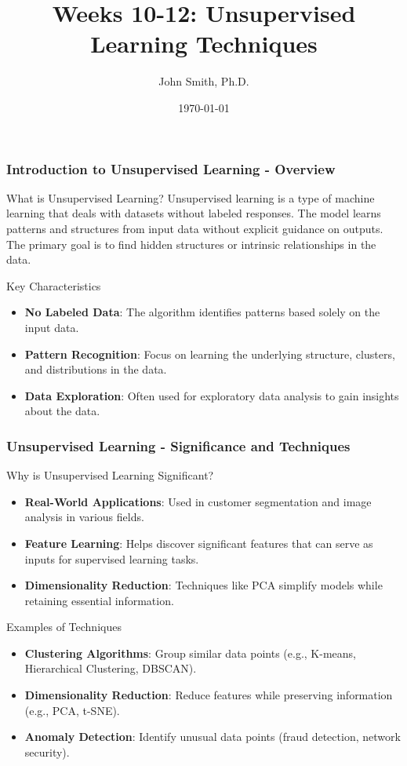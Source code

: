 \documentclass[aspectratio=169]{beamer}
\title[Unsupervised Learning Techniques]{Weeks 10-12: Unsupervised Learning Techniques}
\author[J. Smith]{John Smith, Ph.D.}
\institute[University Name]{
  Department of Computer Science\\
  University Name\\
  \vspace{0.3cm}
  Email: email@university.edu\\
  Website: www.university.edu
}
\date{\today}
\begin{document}
\frame{\titlepage}

\begin{frame}[fragile]
    \frametitle{Introduction to Unsupervised Learning - Overview}
    \begin{block}{What is Unsupervised Learning?}
        Unsupervised learning is a type of machine learning that deals with datasets without labeled responses. The model learns patterns and structures from input data without explicit guidance on outputs. The primary goal is to find hidden structures or intrinsic relationships in the data.
    \end{block}
    
    \begin{block}{Key Characteristics}
        \begin{itemize}
            \item \textbf{No Labeled Data}: The algorithm identifies patterns based solely on the input data.
            \item \textbf{Pattern Recognition}: Focus on learning the underlying structure, clusters, and distributions in the data.
            \item \textbf{Data Exploration}: Often used for exploratory data analysis to gain insights about the data.
        \end{itemize}
    \end{block}
\end{frame}

\begin{frame}[fragile]
    \frametitle{Unsupervised Learning - Significance and Techniques}
    \begin{block}{Why is Unsupervised Learning Significant?}
        \begin{itemize}
            \item \textbf{Real-World Applications}: Used in customer segmentation and image analysis in various fields.
            \item \textbf{Feature Learning}: Helps discover significant features that can serve as inputs for supervised learning tasks.
            \item \textbf{Dimensionality Reduction}: Techniques like PCA simplify models while retaining essential information.
        \end{itemize}
    \end{block}
    
    \begin{block}{Examples of Techniques}
        \begin{itemize}
            \item \textbf{Clustering Algorithms}: Group similar data points (e.g., K-means, Hierarchical Clustering, DBSCAN).
            \item \textbf{Dimensionality Reduction}: Reduce features while preserving information (e.g., PCA, t-SNE).
            \item \textbf{Anomaly Detection}: Identify unusual data points (fraud detection, network security).
        \end{itemize}
    \end{block}
\end{frame}
\end{document}
